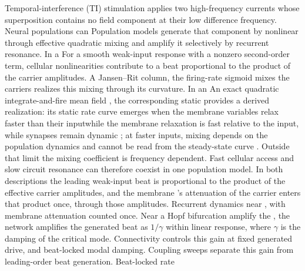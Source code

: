 \documentclass[11pt,a4paper]{article}
\providecommand{\DIFaddtex}[1]{{\protect\color{blue} \sf #1}} %
\providecommand{\DIFdeltex}[1]{{\protect\color{red} \scriptsize #1}} %
\providecommand{\DIFaddbegin}{} %
\providecommand{\DIFaddend}{} %
\providecommand{\DIFdelbegin}{} %
\providecommand{\DIFdelend}{} %
\providecommand{\DIFadd}[1]{\texorpdfstring{\DIFaddtex{#1}}{#1}} %
\providecommand{\DIFdel}[1]{\texorpdfstring{\DIFdeltex{#1}}{}} %
\begin{document}
\else
\noindent
Temporal-interference (TI) stimulation applies two high-frequency currents whose
superposition contains no field component at their low difference frequency. \DIFdelbegin \DIFdel{Neural
populations can }\DIFdelend \DIFaddbegin \DIFadd{Population
models }\DIFaddend generate that component \DIFdelbegin \DIFdel{by nonlinear }\DIFdelend \DIFaddbegin \DIFadd{through effective quadratic }\DIFaddend mixing and amplify it \DIFdelbegin \DIFdel{selectively
}\DIFdelend by
recurrent resonance. \DIFdelbegin \DIFdel{In a }\DIFdelend \DIFaddbegin \DIFadd{For a smooth weak-input response with a nonzero second-order term,
cellular nonlinearities contribute to a beat proportional to the product of the carrier
amplitudes. A }\DIFaddend Jansen--Rit \DIFdelbegin \DIFdel{column,
the }\DIFdelend firing-rate sigmoid \DIFdelbegin \DIFdel{mixes the
carriers }\DIFdelend \DIFaddbegin \DIFadd{realizes this mixing }\DIFaddend through its curvature.
\DIFdelbegin \DIFdel{In an }\DIFdelend \DIFaddbegin \DIFadd{An }\DIFaddend exact quadratic integrate-and-fire mean field \DIFdelbegin \DIFdel{, the
corresponding static }\DIFdelend \DIFaddbegin \DIFadd{provides a derived realization: its
static rate }\DIFaddend curve emerges when \DIFdelbegin \DIFdel{the membrane variables relax faster than their
inputwhile the }\DIFdelend \DIFaddbegin \DIFadd{membrane relaxation is fast relative to the input, while
}\DIFaddend synapses remain dynamic\DIFdelbegin \DIFdel{; at faster inputs, mixing depends on the population dynamics and cannot be read from the steady-state curve}\DIFdelend \DIFaddbegin \DIFadd{. Outside that limit the mixing coefficient is frequency
dependent}\DIFaddend . Fast cellular access and slow circuit resonance can therefore coexist\DIFdelbegin \DIFdel{in one population model. In both
descriptions the leading weak-input beat is proportional to the product of the effective
carrier amplitudes, and the membrane 's attenuation of the carrier enters that product
once, through those amplitudes. Recurrent dynamics near }\DIFdelend \DIFaddbegin \DIFadd{, with
membrane attenuation counted once. Near }\DIFaddend a Hopf bifurcation\DIFdelbegin \DIFdel{amplify the }\DIFdelend \DIFaddbegin \DIFadd{, the network amplifies the
generated }\DIFaddend beat as $1/\gamma$ \DIFaddbegin \DIFadd{within linear response}\DIFaddend , where $\gamma$ is the \DIFdelbegin \DIFdel{damping of the critical mode.
Connectivity
controls this gain at fixed generated drive, and beat-locked }\DIFdelend \DIFaddbegin \DIFadd{modal damping.
Coupling sweeps separate this gain from leading-order beat generation. Beat-locked }\DIFaddend rate
\end{document}

